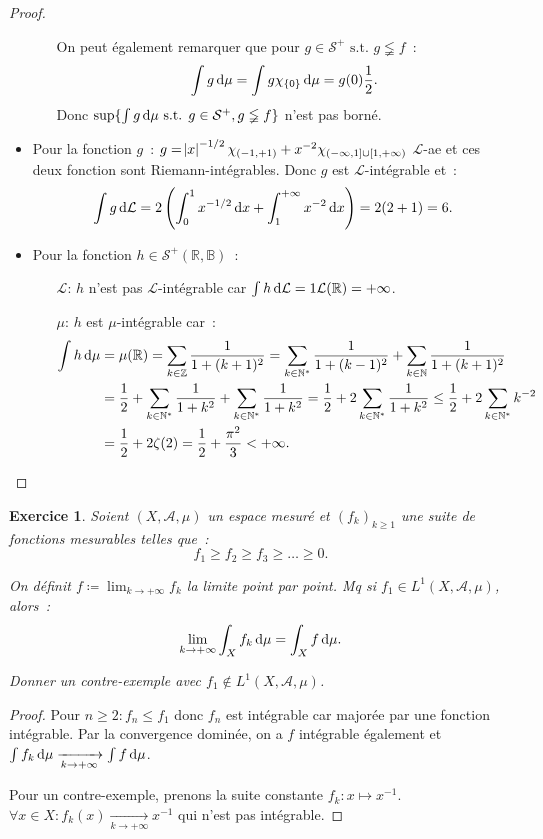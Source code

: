 \documentclass{article}
\newtheorem{ex}{Exercice}[section]
\newcommand{\pinfty}{{+\infty}}
\newcommand{\minfty}{{-\infty}}
\newcommand{\st}{\text{ s.t. }}
\newcommand{\N}{{\mathbb N}}
\newcommand{\Z}{{\mathbb Z}}
\newcommand{\R}{{\mathbb R}}
\newcommand{\B}{{\mathbb B}}
\begin{document}
\begin{proof}
\begin{itemize}
\begin{itemize}
		On peut également remarquer que pour $g \in \mathcal S^+ \st g \lneqq f$~:
		\[\int g\dif\mu = \int g\chi_{\{0\}}\dif\mu = g(0)\frac 12.\]
		Donc $\sup\{\int g\dif\mu \st g \in \mathcal S^+, g \lneqq f\}$ n'est pas borné.
	\end{itemize}
	\item Pour la fonction $g$~: $g = \abs x^{-1/2}\chi_{(-1, +1)} + x^{-2}\chi_{(\minfty, 1] \cup [1, \pinfty)}$ $\mathcal L$-ae et ces deux fonction sont Riemann-intégrables. Donc
	$g$ est $\mathcal L$-intégrable et~:
	\[\int g\dif \mathcal L = 2\left(\int_0^1x^{-1/2}\dif x + \int_1^\pinfty x^{-2}\dif x\right) = 2(2+1) = 6.\]
	\item Pour la fonction $h \in \mathcal S^+(\R, \B)$~:
	\begin{itemize}
		\item[$\mathcal L$:] $h$ n'est pas $\mathcal L$-intégrable car $\int h\dif\mathcal L = 1\mathcal L(\R) = \pinfty$.
		\item[$\mu$:]        $h$ est $\mu$-intégrable car~:
		\begin{align*}
			\int h\dif\mu &= \mu(\R) = \sum_{k \in \Z}\frac 1{1+(k+1)^2} = \sum_{k \in \N^*}\frac 1{1+(k-1)^2} + \sum_{k \in \N}\frac 1{1+(k+1)^2} \\
				&= \frac 12 + \sum_{k \in \N^*}\frac 1{1+k^2} + \sum_{k \in \N^*}\frac 1{1+k^2} = \frac 12 + 2\sum_{k \in \N^*}\frac 1{1+k^2} \leq \frac 12 + 2\sum_{k \in \N^*}k^{-2} \\
				&= \frac 12 + 2\zeta(2) = \frac 12 + \frac {\pi^2}3 < \pinfty.
		\end{align*}
	\end{itemize}
\end{itemize}
\end{proof}

\begin{ex} Soient $(X, \mathcal A, \mu)$ un espace mesuré et $(f_k)_{k \geq 1}$ une suite de fonctions mesurables telles que~:
\[f_1 \geq f_2 \geq f_3 \geq \ldots \geq 0.\]

On définit $f \coloneqq  \lim_{k \to \pinfty}f_k$ la limite point par point. Mq si $f_1 \in L^1(X, \mathcal A, \mu)$, alors~:
\[\lim_{k \to \pinfty}\int_Xf_k\dif\mu = \int_Xf\dif\mu.\]

Donner un contre-exemple avec $f_1 \not \in L^1(X, \mathcal A, \mu)$.
\end{ex}

\begin{proof} Pour $n \geq 2 : f_n \leq f_1$ donc $f_n$ est intégrable car majorée par une fonction intégrable. Par la convergence dominée, on a $f$ intégrable
également et $\int f_k\dif\mu \xrightarrow[k \to \pinfty]{} \int f\dif\mu$.

Pour un contre-exemple, prenons la suite constante $f_k : x \mapsto x^{-1}$. $\forall x \in X : f_k(x) \xrightarrow[k \to \pinfty]{} x^{-1}$ qui n'est pas intégrable.
\end{proof}
\end{document}
